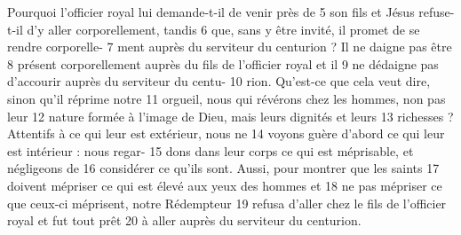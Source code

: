 Pourquoi l'officier royal lui demande-t-il de venir près de	 
5	 	son fils et Jésus refuse-t-il d'y aller corporellement, tandis	 
6	 	que, sans y être invité, il promet de se rendre corporelle-	 
7	 	ment auprès du serviteur du centurion ? Il ne daigne pas être	 
8	 	présent corporellement auprès du fils de l'officier royal et il	 
9	 	ne dédaigne pas d'accourir auprès du serviteur du centu-	 
10	 	rion. Qu'est-ce que cela veut dire, sinon qu'il réprime notre	 
11	 	orgueil, nous qui révérons chez les hommes, non pas leur	 
12	 	nature formée à l'image de Dieu, mais leurs dignités et leurs	 
13	 	richesses ? Attentifs à ce qui leur est extérieur, nous ne	 
14	 	voyons guère d'abord ce qui leur est intérieur : nous regar-	 
15	 	dons dans leur corps ce qui est méprisable, et négligeons de	 
16	 	considérer ce qu'ils sont. Aussi, pour montrer que les saints	 
17	 	doivent mépriser ce qui est élevé aux yeux des hommes et	 
18	 	ne pas mépriser ce que ceux-ci méprisent, notre Rédempteur	 
19	 	refusa d'aller chez le fils de l'officier royal et fut tout prêt	 
20	 	à aller auprès du serviteur du centurion.